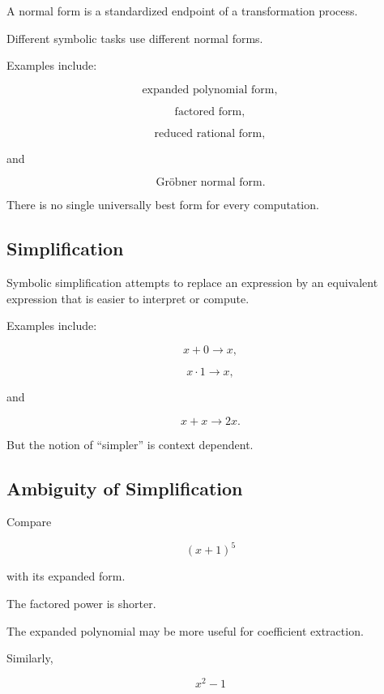 A normal form is a standardized endpoint of a transformation process.

Different symbolic tasks use different normal forms.

Examples include:

\[
\boxed{
\text{expanded polynomial form},
}
\]

\[
\boxed{
\text{factored form},
}
\]

\[
\boxed{
\text{reduced rational form},
}
\]

and

\[
\boxed{
\text{Gröbner normal form}.
}
\]

There is no single universally best form for every computation.

\subsection{Simplification}
\label{subsec:symbolic-simplification}

Symbolic simplification attempts to replace an expression by an equivalent
expression that is easier to interpret or compute.

Examples include:

\[
x+0
\longrightarrow
x,
\]

\[
x\cdot1
\longrightarrow
x,
\]

and

\[
\boxed{
x+x
\longrightarrow
2x.
}
\]

But the notion of ``simpler'' is context dependent.

\subsection{Ambiguity of Simplification}
\label{subsec:simplification-ambiguity}

Compare

\[
\boxed{
(x+1)^5
}
\]

with its expanded form.

The factored power is shorter.

The expanded polynomial may be more useful for coefficient extraction.

Similarly,

\[
\boxed{
x^2-1
}
\]

